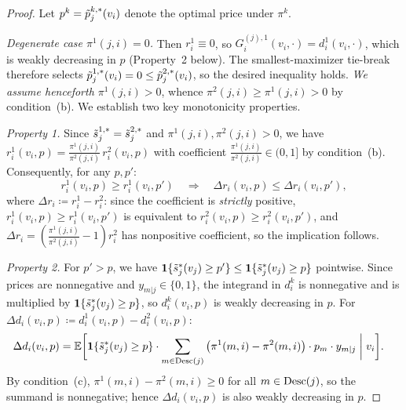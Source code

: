 \begin{proof}
Let $p^k = \tilde{p}^{k,*}_j(v_i)$ denote the optimal price under $\pi^k$.

\emph{Degenerate case $\pi^1(j,i) = 0$.} Then $r^1_i \equiv 0$, so $G^{(j),1}_i(v_i, \cdot) = d^1_i(v_i, \cdot)$, which is weakly decreasing in $p$ (Property~2 below). The smallest-maximizer tie-break therefore selects $\tilde{p}^{1,*}_j(v_i) = 0 \le \tilde{p}^{2,*}_j(v_i)$, so the desired inequality holds. \emph{We assume henceforth $\pi^1(j,i) > 0$}, whence $\pi^2(j,i) \ge \pi^1(j,i) > 0$ by condition~(b). We establish two key monotonicity properties.

\emph{Property 1.} Since $\tilde{s}^{1,*}_j = \tilde{s}^{2,*}_j$ and $\pi^1(j,i), \pi^2(j,i) > 0$, we have $r^1_i(v_i, p) = \frac{\pi^1(j,i)}{\pi^2(j,i)}\, r^2_i(v_i, p)$ with coefficient $\frac{\pi^1(j,i)}{\pi^2(j,i)} \in (0, 1]$ by condition~(b). Consequently, for any $p, p'$:
\begin{equation}
\label{eq:prf:partial:prop1}
r^1_i(v_i, p) \ge r^1_i(v_i, p') \quad\Longrightarrow\quad \Delta r_i(v_i, p) \le \Delta r_i(v_i, p'),
\end{equation}
where $\Delta r_i \coloneqq r^1_i - r^2_i$: since the coefficient is \emph{strictly} positive, $r^1_i(v_i,p) \ge r^1_i(v_i,p')$ is equivalent to $r^2_i(v_i,p) \ge r^2_i(v_i,p')$, and $\Delta r_i = (\frac{\pi^1(j,i)}{\pi^2(j,i)} - 1) r^2_i$ has nonpositive coefficient, so the implication follows.

\emph{Property 2.} For $p' > p$, we have $\bm{1}\{\tilde{s}^*_j(v_j) \ge p'\} \le \bm{1}\{\tilde{s}^*_j(v_j) \ge p\}$ pointwise. Since prices are nonnegative and $y_{m|j} \in \{0,1\}$, the integrand in $d^k_i$ is nonnegative and is multiplied by $\bm{1}\{\tilde{s}^*_j(v_j) \ge p\}$, so $d^k_i(v_i, p)$ is weakly decreasing in $p$. For $\Delta d_i(v_i, p) \coloneqq d^1_i(v_i, p) - d^2_i(v_i, p)$:
\begin{align*}
\Delta d_i(v_i, p) &= \mathbb{E}\bigg[\bm{1}\{\tilde{s}^*_j(v_j) \ge p\} \cdot \sum_{m \in \operatorname{Desc}(j)} \big(\pi^1(m,i) - \pi^2(m,i)\big) \cdot p_m \cdot y_{m|j} \;\bigg|\; v_i\bigg].
\end{align*}
By condition~(c), $\pi^1(m,i) - \pi^2(m,i) \ge 0$ for all $m \in \operatorname{Desc}(j)$, so the summand is nonnegative; hence $\Delta d_i(v_i, p)$ is also weakly decreasing in $p$.


\end{proof}
